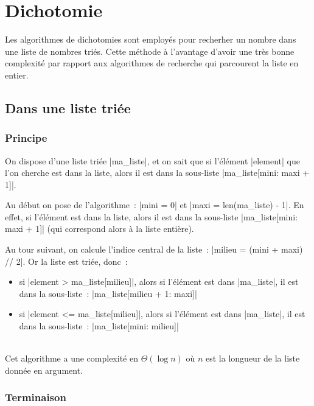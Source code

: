 \section{Dichotomie}

	Les algorithmes de dichotomies sont employés pour recherher un nombre dans une liste de nombres triés. Cette méthode à l'avantage d'avoir une très bonne complexité par rapport aux algorithmes de recherche qui parcourent la liste en entier.

	\subsection{Dans une liste triée}
		
		\subsubsection{Principe}
	
		On dispose d'une liste triée \python|ma_liste|, et on sait que si l'élément \python|element| que l'on cherche est dans la liste, alors il est dans la sous-liste \python|ma_liste[mini: maxi + 1]|.
		
		Au début on pose de l'algorithme~: \python|mini = 0| et \python|maxi = len(ma_liste) - 1|. En effet, si l'élément est dans la liste, alors il est dans la sous-liste \python|ma_liste[mini: maxi + 1]| (qui correspond alors à la liste entière).
		
		Au tour suivant, on calcule l'indice central de la liste~: \python|milieu = (mini + maxi) // 2|. Or la liste est triée, donc~:
		\begin{itemize}
			\item si \python|element > ma_liste[milieu]|, alors si l'élément est dans \python|ma_liste|, il est dans la sous-liste~: \python|ma_liste[milieu + 1: maxi]|
			\item si \python|element <= ma_liste[milieu]|, alors si l'élément est dans \python|ma_liste|, il est dans la sous-liste~: \python|ma_liste[mini: milieu]|
		\end{itemize} \ \\
		
		Cet algorithme a une complexité en $\Theta (\log n)$ où $n$ est la longueur de la liste donnée en argument.
		
		\subsubsection{Terminaison}
		
